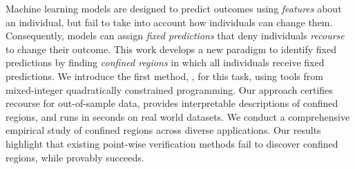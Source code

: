 Machine learning models are designed to predict outcomes using \emph{features} about an individual, but fail to take into account how individuals can change them. Consequently, models can assign \emph{fixed predictions} that deny individuals \emph{recourse} to change their outcome. This work develops a new paradigm to identify fixed predictions by finding \emph{confined regions} in which all individuals receive fixed predictions. We introduce the first method,
\us{}, for this task, using tools from mixed-integer quadratically constrained programming. Our approach certifies recourse for out-of-sample data, provides interpretable descriptions of confined regions, and runs in seconds on real world datasets. We conduct a comprehensive empirical study of confined regions across diverse applications. Our results highlight that existing point-wise verification methods fail to discover confined regions, while \us{} provably succeeds.



